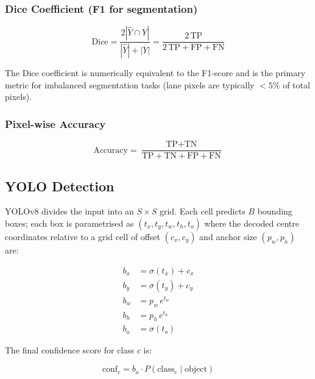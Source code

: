 \documentclass[12pt, a4paper]{article}
\begin{document}
\subsubsection{Dice Coefficient (F1 for segmentation)}

\begin{equation}
  \text{Dice}
  = \frac{2|\hat{Y} \cap Y|}{|\hat{Y}| + |Y|}
  = \frac{2\,\text{TP}}{2\,\text{TP} + \text{FP} + \text{FN}}
  \label{eq:dice}
\end{equation}

The Dice coefficient is numerically equivalent to the F1-score and is
the primary metric for imbalanced segmentation tasks (lane pixels are
typically $<5\%$ of total pixels).

\subsubsection{Pixel-wise Accuracy}

\begin{equation}
  \text{Accuracy}
  = \frac{\text{TP} + \text{TN}}{\text{TP} + \text{TN} + \text{FP} + \text{FN}}
  \label{eq:acc}
\end{equation}

\subsection{YOLO Detection}

YOLOv8 divides the input into an $S \times S$ grid. Each cell predicts
$B$ bounding boxes; each box is parametrised as $(t_x, t_y, t_w, t_h, t_o)$
where the decoded centre coordinates relative to a grid cell of offset
$(c_x, c_y)$ and anchor size $(p_w, p_h)$ are:

\begin{align}
  b_x &= \sigma(t_x) + c_x \\
  b_y &= \sigma(t_y) + c_y \\
  b_w &= p_w\, e^{t_w}   \\
  b_h &= p_h\, e^{t_h}   \\
  b_o &= \sigma(t_o)
  \label{eq:yolo_decode}
\end{align}

The final confidence score for class $c$ is:

\begin{equation}
  \text{conf}_c = b_o \cdot P(\text{class}_c \mid \text{object})
  \label{eq:yolo_conf}
\end{equation}
\end{document}
